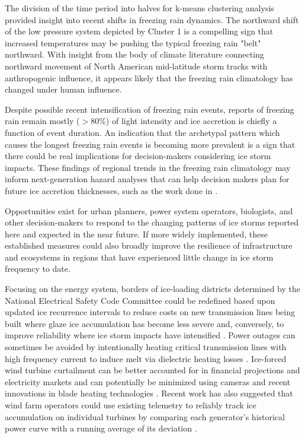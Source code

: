 \documentclass[twocol]{ametsoc}
\begin{document}
The division of the time period into halves for k-means clustering analysis provided insight into recent shifts in freezing rain dynamics. The northward shift of the low pressure system depicted by Cluster 1 is a compelling sign that increased temperatures may be pushing the typical freezing rain "belt" northward. With insight from the body of climate literature connecting northward movement of North American mid-latitude storm tracks with anthropogenic influence, it appears likely that the freezing rain climatology has changed under human influence. 

Despite possible recent intensification of freezing rain events, reports of freezing rain remain mostly ($>$80\%) of light intensity and ice accretion is chiefly a function of event duration. An indication that the archetypal pattern which causes the longest freezing rain events is becoming more prevalent is a sign that there could be real implications for decision-makers considering ice storm impacts. These findings of regional trends in the freezing rain climatology may inform next-generation hazard analyses that can help decision makers plan for future ice accretion thicknesses, such as the work done in \citet{erfani2014aggregated}.

Opportunities exist for urban planners, power system operators, biologists, and other decision-makers to respond to the changing patterns of ice storms reported here and expected in the near future. If more widely implemented, these established measures could also broadly improve the resilience of infrastructure and ecosystems in regions that have experienced little change in ice storm frequency to date. 

Focusing on the energy system, borders of ice-loading districts determined by the National Electrical Safety Code Committee could be redefined based upon updated ice recurrence intervals to reduce costs on new transmission lines being built where glaze ice accumulation has become less severe and, conversely, to improve reliability where ice storm impacts have intensified \citep{american2013minimum}. Power outages can sometimes be avoided by intentionally heating critical transmission lines with high frequency current to induce melt via dielectric heating losses \citep{bendel1981review,huneault2005combined}. Ice-forced wind turbine curtailment can be better accounted for in financial projections and electricity markets and can potentially be minimized using cameras and recent innovations in blade heating technologies \citep{bird2014wind}. Recent work has also suggested that wind farm operators could use existing telemetry to reliably track ice accumulation on individual turbines by comparing each generator's historical power curve with a running average of its deviation \citep{davis2016ice}.
\end{document}
